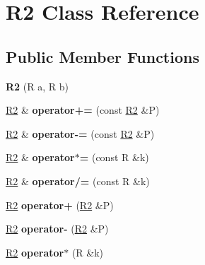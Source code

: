 \hypertarget{class_r2}{}\section{R2 Class Reference}
\label{class_r2}
\subsection*{Public Member Functions}
\begin{DoxyCompactItemize}
\item 
{\bfseries R2} (R a, R b)\hypertarget{class_r2_a8d7d9af27c0e94323a3f775b71a0cfb6}{}\label{class_r2_a8d7d9af27c0e94323a3f775b71a0cfb6}

\item 
\hyperlink{class_r2}{R2} \& {\bfseries operator+=} (const \hyperlink{class_r2}{R2} \&P)\hypertarget{class_r2_ad7752be0cb083308920aeb8cd8eae2de}{}\label{class_r2_ad7752be0cb083308920aeb8cd8eae2de}

\item 
\hyperlink{class_r2}{R2} \& {\bfseries operator-\/=} (const \hyperlink{class_r2}{R2} \&P)\hypertarget{class_r2_addff4a2b70695ced44051ee1b5dbe360}{}\label{class_r2_addff4a2b70695ced44051ee1b5dbe360}

\item 
\hyperlink{class_r2}{R2} \& {\bfseries operator$\ast$=} (const R \&k)\hypertarget{class_r2_a14b5e1a68aaf96d8c4f19c7b0cf714b7}{}\label{class_r2_a14b5e1a68aaf96d8c4f19c7b0cf714b7}

\item 
\hyperlink{class_r2}{R2} \& {\bfseries operator/=} (const R \&k)\hypertarget{class_r2_a84ef02112ea25065158058cf97e28704}{}\label{class_r2_a84ef02112ea25065158058cf97e28704}

\item 
\hyperlink{class_r2}{R2} {\bfseries operator+} (\hyperlink{class_r2}{R2} \&P)\hypertarget{class_r2_aa07feaf6e1194c23c9b5fa31b3ad9976}{}\label{class_r2_aa07feaf6e1194c23c9b5fa31b3ad9976}

\item 
\hyperlink{class_r2}{R2} {\bfseries operator-\/} (\hyperlink{class_r2}{R2} \&P)\hypertarget{class_r2_ae9e490cc69cdf181bea7fcc393e84e5a}{}\label{class_r2_ae9e490cc69cdf181bea7fcc393e84e5a}

\item 
\hyperlink{class_r2}{R2} {\bfseries operator$\ast$} (R \&k)\hypertarget{class_r2_a4a4c6c822bd42536b506f959bc3d3fa3}{}\label{class_r2_a4a4c6c822bd42536b506f959bc3d3fa3}


\end{DoxyCompactItemize}
